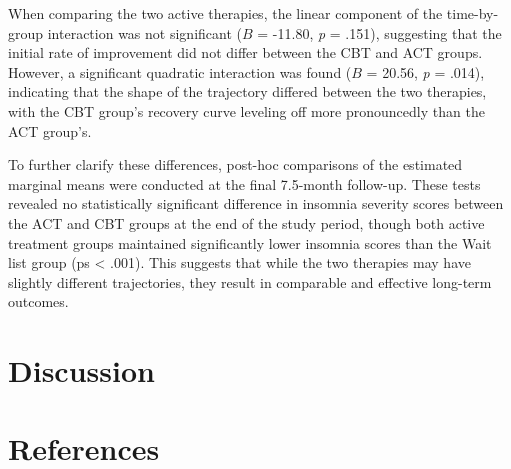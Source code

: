 \documentclass[
  man]{apa6}
\newlength{\cslhangindent}
\newenvironment{CSLReferences}[2] %
 {\begin{list}{}{%
  \setlength{\itemindent}{0pt}
  \setlength{\leftmargin}{0pt}
  \setlength{\parsep}{0pt}
  \ifodd #1
   \setlength{\leftmargin}{\cslhangindent}
   \setlength{\itemindent}{-1\cslhangindent}
  \fi
  \setlength{\itemsep}{#2\baselineskip}}}
 {\end{list}}
\begin{document}
When comparing the two active therapies, the linear component of the time-by-group interaction was not significant (\(B\) = -11.80, \emph{p} = .151), suggesting that the initial rate of improvement did not differ between the CBT and ACT groups. However, a significant quadratic interaction was found (\(B\) = 20.56, \emph{p} = .014), indicating that the shape of the trajectory differed between the two therapies, with the CBT group's recovery curve leveling off more pronouncedly than the ACT group's.

To further clarify these differences, post-hoc comparisons of the estimated marginal means were conducted at the final 7.5-month follow-up. These tests revealed no statistically significant difference in insomnia severity scores between the ACT and CBT groups at the end of the study period, though both active treatment groups maintained significantly lower insomnia scores than the Wait list group (ps \textless{} .001). This suggests that while the two therapies may have slightly different trajectories, they result in comparable and effective long-term outcomes.

\section{Discussion}\label{discussion}

\newpage

\section{References}\label{references}

\label{refs}
\begin{CSLReferences}{0}{1}
\end{CSLReferences}
\end{document}
